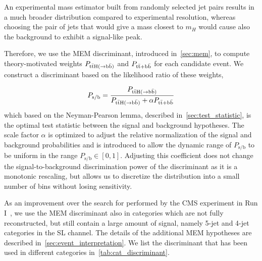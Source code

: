 An experimental mass estimator built from randomly selected jet pairs results in a much broader distribution compared to experimental resolution, whereas choosing the pair of jets that would give a mass closest to $m_H$ would cause also the background to exhibit a signal-like peak.

Therefore, we use the MEM discriminant, introduced in~\cref{sec:mem}, to compute theory-motivated weights $P_{\mathrm{t} \bar{\mathrm{t}} \mathrm{H} (\rightarrow \mathrm{b}\bar{\mathrm{b}})}$ and $P_{\mathrm{t} \bar{\mathrm{t}} + \mathrm{b}\bar{\mathrm{b}}}$ for each candidate event. We construct a discriminant based on the likelihood ratio of these weights,

\begin{equation}
\label{eq:mem_ratio}
P_{\mathrm{s}/\mathrm{b}} = \frac{P_{\mathrm{t} \bar{\mathrm{t}} \mathrm{H} (\rightarrow \mathrm{b}\bar{\mathrm{b}})}}{P_{\mathrm{t} \bar{\mathrm{t}} \mathrm{H} (\rightarrow \mathrm{b}\bar{\mathrm{b}})} + \alpha P_{\mathrm{t} \bar{\mathrm{t}} + \mathrm{b}\bar{\mathrm{b}}}}
\end{equation} 
which based on the Neyman-Pearson lemma, described in~\cref{sec:test_statistic}, is the optimal test statistic between the signal and background hypotheses. The scale factor $\alpha$ is optimized to adjust the relative normalization of the signal and background probabilities and is introduced to allow the dynamic range of $P_{\mathrm{s}/\mathrm{b}}$ to be uniform in the range $P_{\mathrm{s}/\mathrm{b}} \in [0, 1]$. Adjusting this coefficient does not change the signal-to-background discrimination power of the discriminant as it is a monotonic rescaling, but allows us to discretize the distribution into a small number of bins without losing sensitivity.

As an improvement over the search for \ttHbb performed by the CMS experiment in Run I~\cite{Khachatryan:2015ila}, we use the MEM discriminant also in categories which are not fully reconstructed, but still contain a large amount of signal, namely 5-jet and 4-jet categories in the SL channel. The details of the additional MEM hypotheses are described in~\cref{sec:event_interpretation}. We list the discriminant that has been used in different categories in~\cref{tab:cat_discriminant}. 


